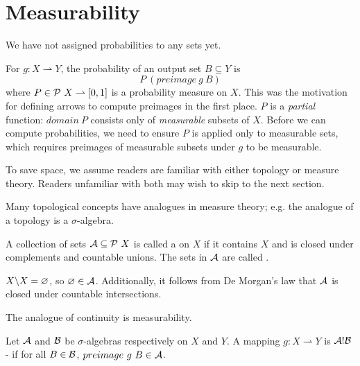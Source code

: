 \documentclass[preprint]{sigplanconf}
\newcommand{\pto}{\rightharpoonup}
\begin{document}

\section{Measurability}
\label{sec:measurability}

We have not assigned probabilities to any sets yet.

For $g : X \pto Y$, the probability of an output set $B \subseteq Y$ is
\begin{equation}
	P~(preimage~g~B)
\end{equation}
where $P \in \powerset~X \pto [0,1]$ is a probability measure on $X$.
This was the motivation for defining arrows to compute preimages in the first place.
$P$ is a \emph{partial} function: $domain~P$ consists only of \emph{measurable} subsets of $X$.
Before we can compute probabilities, we need to ensure $P$ is applied only to measurable sets, which requires preimages of measurable subsets under $g$ to be measurable.

To save space, we assume readers are familiar with either topology or measure theory.
Readers unfamiliar with both may wish to skip to the next section.

Many topological concepts have analogues in measure theory; e.g. the analogue of a topology is a $\sigma$-algebra.

\begin{definition}
A collection of sets $\mathcal{A} \subseteq \mathcal{P}~X$ is called a  on $X$ if it contains $X$ and is closed under complements and countable unions.
The sets in $\mathcal{A}$ are called .
\end{definition}

$X \backslash X = \varnothing$, so $\varnothing \in \mathcal{A}$.
Additionally, it follows from De Morgan's law that $\mathcal{A}$ is closed under countable intersections.

The analogue of continuity is measurability.

\begin{definition}
Let $\mathcal{A}$ and $\mathcal{B}$ be $\sigma$-algebras respectively on $X$ and $Y$.
A mapping $g : X \pto Y$ is $\mathcal{A}!\mathcal{B}$- if for all $B \in \mathcal{B}$, $preimage~g~B \in \mathcal{A}$.
\end{definition}
\end{document}
